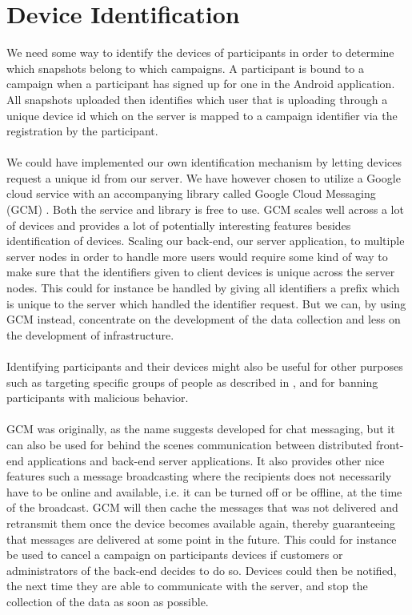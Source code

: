 
\section{Device Identification}
\label{sec:device_identification}

We need some way to identify the devices of participants in order to determine which snapshots belong to which campaigns. A participant is bound to a campaign when a participant has signed up for one in the Android application. All snapshots uploaded then identifies which user that is uploading through a unique device id which on the server is mapped to a campaign identifier via the registration by the participant. 
\\\\
We could have implemented our own identification mechanism by letting devices request a unique id from our server. We have however chosen to utilize a Google cloud service with an accompanying library called Google Cloud Messaging (GCM) \parencite{google_cloud_messaging}. Both the service and library is free to use. GCM scales well across a lot of devices and provides a lot of potentially interesting features besides identification of devices. Scaling our back-end, our server application, to multiple server nodes in order to handle more users would require some kind of way to make sure that the identifiers given to client devices is unique across the server nodes. This could for instance be handled by giving all identifiers a prefix which is unique to the server which handled the identifier request. But we can, by using GCM instead, concentrate on the development of the data collection and less on the development of infrastructure.
\\\\
Identifying participants and their devices might also be useful for other purposes such as targeting specific groups of people as described in , and for banning participants with malicious behavior. 
\\\\
GCM was originally, as the name suggests developed for chat messaging, but it can also be used for behind the scenes communication between distributed front-end applications and back-end server applications. It also provides other nice features such a message broadcasting where the recipients does not necessarily have to be online and available, i.e. it can be turned off or be offline, at the time of the broadcast. GCM will then cache the messages that was not delivered and retransmit them once the device becomes available again, thereby guaranteeing that messages are delivered at some point in the future. This could for instance be used to cancel a campaign on participants devices if customers or administrators of the back-end decides to do so. Devices could then be notified, the next time they are able to communicate with the server, and stop the collection of the data as soon as possible. 